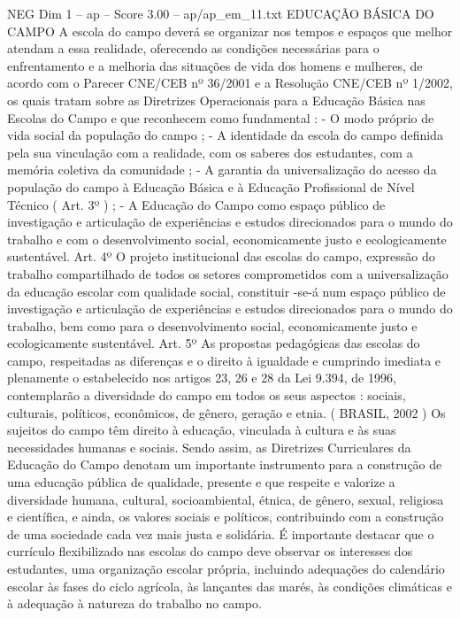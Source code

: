 \begin{textsample}{NEG Dim 1 – ap – Score 3.00 – ap/ap\_em\_11.txt}  \label{ex:f1_neg_126}
EDUCAÇÃO BÁSICA DO CAMPO A escola do campo deverá se organizar nos tempos e espaços que melhor atendam a essa realidade, oferecendo as condições necessárias para o enfrentamento e a melhoria das situações de vida dos homens e mulheres, de acordo com o Parecer CNE/CEB nº 36/2001 e a Resolução CNE/CEB nº 1/2002, os quais tratam sobre as Diretrizes Operacionais para a Educação Básica nas Escolas do Campo e que reconhecem como fundamental : - O modo próprio de vida social da população do campo ; - A identidade da escola do campo definida pela sua vinculação com a realidade, com os saberes dos estudantes, com a memória coletiva da comunidade ; - A garantia da universalização do acesso da população do campo à Educação Básica e à Educação Profissional de Nível Técnico ( Art. 3º ) ; - A Educação do Campo como espaço público de investigação e articulação de experiências e estudos direcionados para o mundo do trabalho e com o desenvolvimento social, economicamente justo e ecologicamente sustentável.
Art. 4º O projeto institucional das escolas do campo, expressão do trabalho compartilhado de todos os setores comprometidos com a universalização da educação escolar com qualidade social, constituir -se-á num espaço público de investigação e articulação de experiências e estudos direcionados para o mundo do trabalho, bem como para o desenvolvimento social, economicamente justo e ecologicamente sustentável.
Art. 5º As propostas pedagógicas das escolas do campo, respeitadas as diferenças e o direito à igualdade e cumprindo imediata e plenamente o estabelecido nos artigos 23, 26 e 28 da Lei 9.394, de 1996, contemplarão a diversidade do campo em todos os seus aspectos : sociais, culturais, políticos, econômicos, de gênero, geração e etnia. ( BRASIL, 2002 ) Os sujeitos do campo têm direito à educação, vinculada à cultura e às suas necessidades humanas e sociais.
Sendo assim, as Diretrizes Curriculares da Educação do Campo denotam um importante instrumento para a construção de uma educação pública de qualidade, presente e que respeite e valorize a diversidade humana, cultural, socioambiental, étnica, de gênero, sexual, religiosa e científica, e ainda, os valores sociais e políticos, contribuindo com a construção de uma sociedade cada vez mais justa e solidária.
É importante destacar que o currículo flexibilizado nas escolas do campo deve observar os interesses dos estudantes, uma organização escolar própria, incluindo adequações do calendário escolar às fases do ciclo agrícola, às lançantes das marés, às condições climáticas e à adequação à natureza do trabalho no campo.

\end{textsample}
